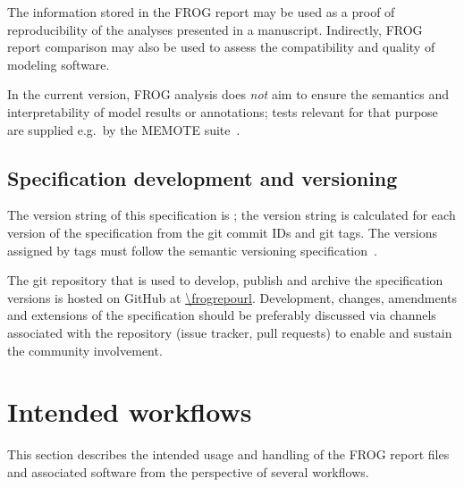 The information stored in the FROG report may be used as a proof of reproducibility of the analyses presented in a manuscript. Indirectly, FROG report comparison may also be used to assess the compatibility and quality of modeling software.

In the current version, FROG analysis does \emph{not} aim to ensure the semantics and interpretability of model results or annotations; tests relevant for that purpose are supplied e.g.~by the MEMOTE suite~\cite{lieven2020memote}.

\subsection{Specification development and versioning}

The version string of this specification is \texttt{\frogspecversion}; the version string is calculated for each version of the specification from the git commit IDs and git tags. The versions assigned by tags must follow the semantic versioning specification~\cite{semver}.

The git repository that is used to develop, publish and archive the specification versions is hosted on GitHub at \url{\frogrepourl}. Development, changes, amendments and extensions of the specification should be preferably discussed via channels associated with the repository (issue tracker, pull requests) to enable and sustain the community involvement.

\section{Intended workflows}

This section describes the intended usage and handling of the FROG report files and associated software from the perspective of several workflows.

